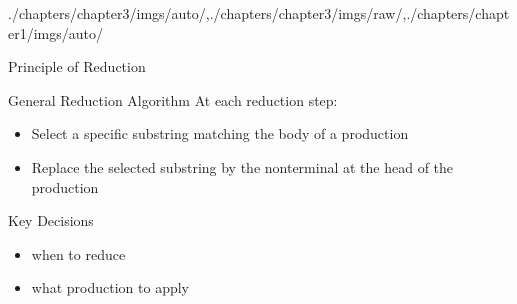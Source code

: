 \begin{graphicspathcontext}{{./chapters/chapter3/imgs/auto/},{./chapters/chapter3/imgs/raw/},{./chapters/chapter1/imgs/auto/}}
\begin{bibunit}[apalike]
\begin{frame}{Principle of Reduction}
	\begin{definitionblock}{General Reduction Algorithm}
		At each reduction step:
		\begin{itemize}
			\item Select a specific substring matching the body of a production
			\item Replace the selected substring by the nonterminal at the head of the production
		\end{itemize}
	\end{definitionblock}
	\vspace{.5cm}
	\begin{block}{Key Decisions}
		\begin{itemize}
			\item when to reduce
			\item what production to apply
		\end{itemize}
	\end{block}
\end{frame}


\end{bibunit}
\end{graphicspathcontext}
